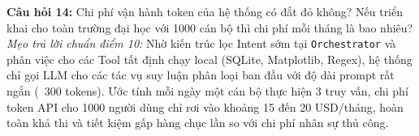 \begin{checkpointbox}
\textbf{Câu hỏi 14:} Chi phí vận hành token của hệ thống có đắt đỏ không? Nếu triển khai cho toàn trường đại học với 1000 cán bộ thì chi phí mỗi tháng là bao nhiêu?\\
\textit{Mẹo trả lời chuẩn điểm 10:} Nhờ kiến trúc lọc Intent sớm tại \texttt{Orchestrator} và phân việc cho các Tool tất định chạy local (SQLite, Matplotlib, Regex), hệ thống chỉ gọi LLM cho các tác vụ suy luận phân loại ban đầu với độ dài prompt rất ngắn (~300 tokens). Ước tính mỗi ngày một cán bộ thực hiện 3 truy vấn, chi phí token API cho 1000 người dùng chỉ rơi vào khoảng 15 đến 20 USD/tháng, hoàn toàn khả thi và tiết kiệm gấp hàng chục lần so với chi phí nhân sự thủ công.
\end{checkpointbox}

